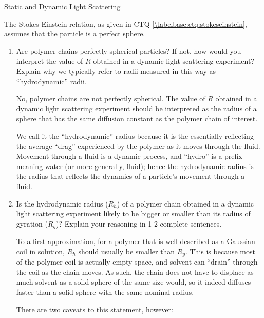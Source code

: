 \begin{activity}{Static and Dynamic Light Scattering}
\begin{exercises}

	\exercise The Stokes-Einstein relation, as given in CTQ \ref{\labelbase:ctq:stokeseinstein}, assumes that the particle is a perfect sphere.
	
		\begin{enumerate}
		
			\item Are polymer chains perfectly spherical particles?  If not, how would you interpret the value of $R$ obtained in a dynamic light scattering experiment?  Explain why we typically refer to radii measured in this way as ``hydrodynamic'' radii.
			
				\begin{solution}{}
					No, polymer chains are not perfectly spherical.  The value of $R$ obtained in a dynamic light scattering experiment should be interpreted as the radius of a sphere that has the same diffusion constant as the polymer chain of interest.
					
					We call it the ``hydrodynamic'' radius because it is the essentially reflecting the average ``drag'' experienced by the polymer as it moves through the fluid.  Movement through a fluid is a dynamic process, and ``hydro'' is a prefix meaning water (or more generally, fluid); hence the hydrodynamic radius is the radius that reflects the dynamics of a particle's movement through a fluid.

				\end{solution}
			
			\item Is the hydrodynamic radius ($R_h$) of a polymer chain obtained in a dynamic light scattering experiment likely to be bigger or smaller than its radius of gyration ($R_g$)?  Explain your reasoning in 1-2 complete sentences.
			
				\begin{solution}{}
				
				To a first approximation, for a polymer that is well-described as a Gaussian coil in solution, $R_h$ should usually be smaller than $R_g$.  This is because most of the polymer coil is actually empty space, and solvent can ``drain'' through the coil as the chain moves.  As such, the chain does not have to displace as much solvent as a solid sphere of the same size would, so it indeed diffuses faster than a solid sphere with the same nominal radius.

There are two caveats to this statement, however:


\end{solution}
\end{enumerate}
\end{exercises}
\end{activity}

